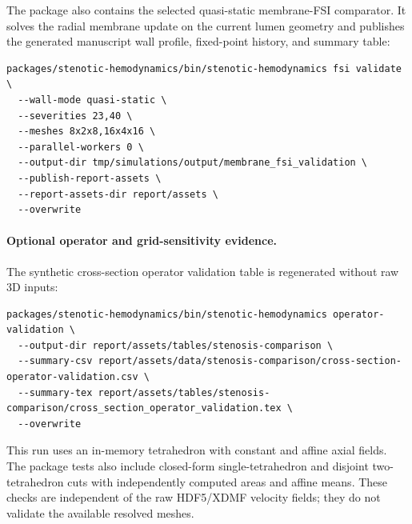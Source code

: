 The package also contains the selected quasi-static membrane-FSI comparator. It
solves the radial membrane update on the current lumen geometry and publishes
the generated manuscript wall profile, fixed-point history, and summary table:
\begin{lstlisting}[basicstyle=\ttfamily\footnotesize,breaklines=true]
packages/stenotic-hemodynamics/bin/stenotic-hemodynamics fsi validate \
  --wall-mode quasi-static \
  --severities 23,40 \
  --meshes 8x2x8,16x4x16 \
  --parallel-workers 0 \
  --output-dir tmp/simulations/output/membrane_fsi_validation \
  --publish-report-assets \
  --report-assets-dir report/assets \
  --overwrite
\end{lstlisting}

\paragraph*{Optional operator and grid-sensitivity evidence.}
The synthetic cross-section operator validation table is regenerated without
raw 3D inputs:
\begin{lstlisting}[basicstyle=\ttfamily\footnotesize,breaklines=true]
packages/stenotic-hemodynamics/bin/stenotic-hemodynamics operator-validation \
  --output-dir report/assets/tables/stenosis-comparison \
  --summary-csv report/assets/data/stenosis-comparison/cross-section-operator-validation.csv \
  --summary-tex report/assets/tables/stenosis-comparison/cross_section_operator_validation.tex \
  --overwrite
\end{lstlisting}
This run uses an in-memory tetrahedron with constant and affine axial fields.
The package tests also include closed-form single-tetrahedron and disjoint
two-tetrahedron cuts with independently computed areas and affine means. These
checks are independent of the raw HDF5/XDMF velocity fields; they do not
validate the available resolved meshes.

